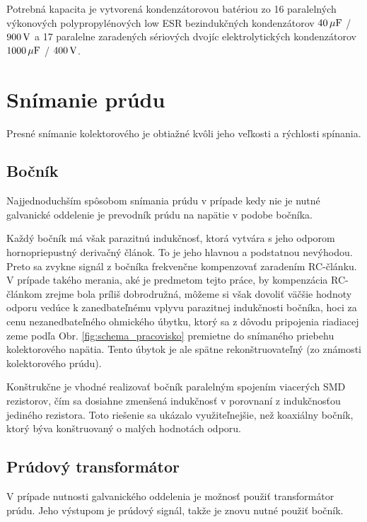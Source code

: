 Potrebná kapacita je vytvorená kondenzátorovou batériou zo 16 paralelných výkonových polypropylénových low ESR bezindukčných kondenzátorov \cite{kondenzator-polypropylen} $40\, \mathrm{\mu F}$ / $900\, \mathrm{V}$ a 17 paralelne zaradených sériových dvojíc elektrolytických kondenzátorov \cite{kondenzator-elektrolyt} $1000 \, \mathrm{\mu F}$ / $400\, \mathrm{V}$.


\section{Snímanie prúdu} \label{sec:snimanie_prudu}

Presné snímanie kolektorového je obtiažné kvôli jeho veľkosti a rýchlosti spínania. 


\subsection{Bočník}
Najjednoduchším spôsobom snímania prúdu v prípade kedy nie je nutné galvanické oddelenie je prevodník prúdu na napätie v podobe bočníka.

Každý bočník má však parazitnú indukčnosť, ktorá vytvára s jeho odporom hornopriepustný derivačný článok. To je jeho hlavnou a podstatnou nevýhodou. Preto sa zvykne signál z bočníka frekvenčne kompenzovať zaradením RC-článku. V prípade takého merania, aké je predmetom tejto práce, by kompenzácia RC-článkom zrejme bola príliš dobrodružná, môžeme si však dovoliť väčšie hodnoty odporu vedúce k zanedbateľnému vplyvu parazitnej indukčnosti bočníka, hoci za cenu nezanedbateľného ohmického úbytku, ktorý sa z dôvodu pripojenia riadiacej zeme podľa Obr. \ref{fig:schema_pracovisko} premietne do snímaného priebehu kolektorového napätia. Tento úbytok je ale spätne rekonštruovateľný (zo známosti kolektorového prúdu).

Konštrukčne je vhodné realizovať bočník paralelným spojením viacerých SMD rezistorov, čím sa dosiahne zmenšená indukčnosť v porovnaní z indukčnosťou jediného rezistora.
Toto riešenie sa ukázalo využiteľnejšie, než koaxiálny bočník, ktorý býva konštruovaný o malých hodnotách odporu.


\subsection{Prúdový transformátor}
V prípade nutnosti galvanického oddelenia je možnosť použiť transformátor prúdu. Jeho výstupom je prúdový signál, takže je znovu nutné použiť bočník.

